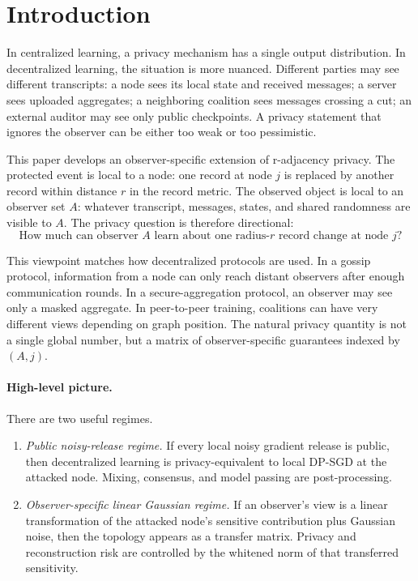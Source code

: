 \documentclass[conference,compsoc]{IEEEtran}
\begin{document}
\section{Introduction}

In centralized learning, a privacy mechanism has a single output distribution. In decentralized learning, the situation is more nuanced. Different parties may see different transcripts: a node sees its local state and received messages; a server sees uploaded aggregates; a neighboring coalition sees messages crossing a cut; an external auditor may see only public checkpoints. A privacy statement that ignores the observer can be either too weak or too pessimistic.

This paper develops an observer-specific extension of r-adjacency privacy. The protected event is local to a node: one record at node $j$ is replaced by another record within distance $r$ in the record metric. The observed object is local to an observer set $A$: whatever transcript, messages, states, and shared randomness are visible to $A$. The privacy question is therefore directional:
\[
\text{How much can observer }A\text{ learn about one radius-}r\text{ record change at node }j?
\]

This viewpoint matches how decentralized protocols are used. In a gossip protocol, information from a node can only reach distant observers after enough communication rounds. In a secure-aggregation protocol, an observer may see only a masked aggregate. In peer-to-peer training, coalitions can have very different views depending on graph position. The natural privacy quantity is not a single global number, but a matrix of observer-specific guarantees indexed by $(A,j)$.

\paragraph{High-level picture.}
There are two useful regimes.
\begin{enumerate}[leftmargin=1.4em]
    \item \emph{Public noisy-release regime.} If every local noisy gradient release is public, then decentralized learning is privacy-equivalent to local DP-SGD at the attacked node. Mixing, consensus, and model passing are post-processing.
    \item \emph{Observer-specific linear Gaussian regime.} If an observer's view is a linear transformation of the attacked node's sensitive contribution plus Gaussian noise, then the topology appears as a transfer matrix. Privacy and reconstruction risk are controlled by the whitened norm of that transferred sensitivity.
\end{enumerate}
\end{document}
